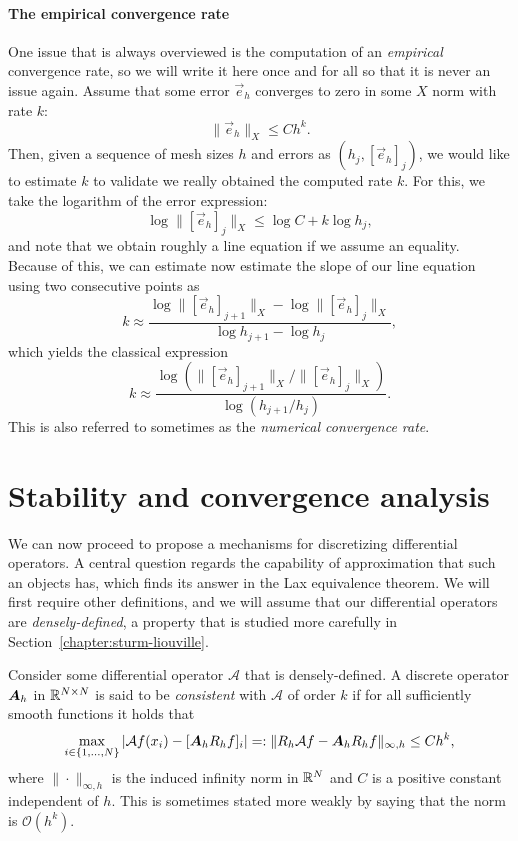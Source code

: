 \paragraph{The empirical convergence rate} One issue that is always overviewed is the computation of an \emph{empirical} convergence rate, so we will write it here once and for all so that it is never an issue again. Assume that some error $\vec e_h$ converges to zero in some $X$ norm with rate $k$:
\begin{equation*}
    \|\vec e_h\|_X \leq C h^k.
\end{equation*}
Then, given a sequence of mesh sizes $h$ and errors as $(h_j, [\vec e_h]_j)$, we would like to estimate $k$ to validate we really obtained the computed rate $k$. For this, we take the logarithm of the error expression:
\begin{equation*}
    \log \|[\vec e_h]_j\|_X \leq \log C + k \log h_j,
\end{equation*}
and note that we obtain roughly a line equation if we assume an equality. Because of this, we can estimate now estimate the slope of our line equation using two consecutive points as
\begin{equation*}
    k \approx \frac{\log \|[\vec e_h]_{j+1}\|_X - \log \|[\vec e_h]_j\|_X}{ \log h_{j+1} - \log h_j},
\end{equation*}
which yields the classical expression
\begin{equation}
    k \approx  \frac{\log \left(\|[\vec e_h]_{j+1}\|_X / \|[\vec e_h]_j\|_X\right)}{ \log \left(h_{j+1} / h_j\right)}.
\end{equation}
This is also referred to sometimes as the \emph{numerical convergence rate}. 

\section{Stability and convergence analysis}\label{sec:fd-convergence-analysiss}
We can now proceed to propose a mechanisms for discretizing differential operators. A central question regards the capability of approximation that such an objects has, which finds its answer in the Lax equivalence theorem. We will first require other definitions, and we will assume that our differential operators are \emph{densely-defined}, a property that is studied more carefully in Section~\ref{chapter:sturm-liouville}.

\begin{definition}[Consistency]
    Consider some differential operator $\mathcal A$ that is densely-defined. A discrete operator $\mat A_h$ in $\mathbb{R}^{N\times N}$ is said to be \emph{consistent} with $\mathcal A$ of order $k$ if for all sufficiently smooth functions it holds that
    \begin{equation}\label{def:consistency}
        \max_{i\in\{1,\hdots,N\}}|\mathcal Af(x_i) - [\mat A_h R_h f]_i| =: \|R_h \mathcal Af - \mat A_hR_h f\|_{\infty,h} \leq C h^k,
    \end{equation}
    where $\|\cdot \|_{\infty,h}$ is the induced infinity norm in $\mathbb{R}^N$ and $C$ is a positive constant independent of $h$. This is sometimes stated more weakly by saying that the norm is $\mathcal O(h^k)$. 
\end{definition}


